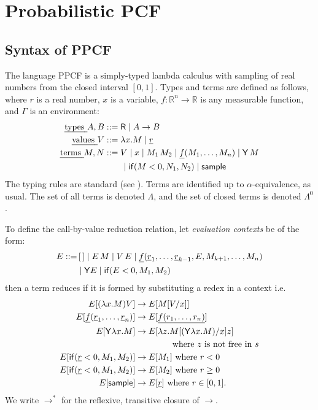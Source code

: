 \section{Probabilistic PCF}
\label{sec:PPCF}

\subsection{Syntax of PPCF}

The language PPCF is a simply-typed lambda calculus with sampling of real numbers from the closed interval $[0,1]$. 
Types and terms are defined as follows, where $r$ is a real number, $x$ is a variable, $f : \mathbb{R}^n \to \mathbb{R}$ is any measurable function, and $\Gamma$ is an environment:
\begin{align*}
  \text{\em types } A, B &::= \textsf{R}  \mid  A \to B \\
  \text{\em values } V &::= \lambda x.M  \mid  \underline{r} \\
  \text{\em terms } M, N &::= V  \mid  x  \mid  M_1 \, M_2  \mid  \underline{f}(M_1,\dots ,M_n)  \mid  \mathsf{Y} \, M \\
   & \qquad \mid  \mathsf{if}(M < 0, N_1, N_2)  \mid  \mathsf{sample}
\end{align*}
The typing rules are standard (see ).
Terms are identified up to $\alpha$-equivalence, as usual. 
The set of all terms is denoted $\Lambda$, and the set of closed terms is denoted $\Lambda^0$.

To define the call-by-value reduction relation, let \emph{evaluation contexts} be of the form:
\begin{align*}
  E ::= & \, [\,] \mid E \, M \mid V \, E \mid \underline{f}(\underline r_1,\dots ,\underline r_{k-1}, E, M_{k+1}, \dots, M_n) \\ & \mid \mathsf{Y} E \mid \mathsf{if}(E<0, M_1, M_2)
\end{align*}
then a term reduces if it is formed by substituting a redex in a context i.e.
\begin{align*}
  E[(\lambda x.M) V] & \to E[M[V/x]] \\
  E[\underline f (\underline r_1, \dots , \underline r_n)] & \to E[\underline{f(r_1,\dots,r_n)}] \\
  E[\mathsf{Y} \lambda x. M] & \to E[\lambda z. M[(\mathsf{Y} \lambda x. M)/x] z] \\
  & \qquad \qquad \text{ where $z$ is not free in $s$}\\
  E[\mathsf{if}(\underline r < 0, M_1, M_2)] & \to E[M_1] \text{ where }r < 0 \\
  E[\mathsf{if}(\underline r < 0, M_1, M_2)] & \to E[M_2] \text{ where }r \geq 0 \\
  E[\mathsf{sample}] & \to E[\underline r] \text{ where } r \in [0,1].
\end{align*}
We write $\to^\ast$ for the reflexive, transitive closure of $\to$.

